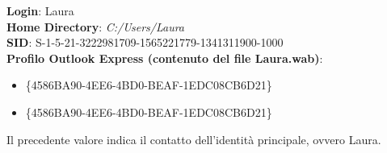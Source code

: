 \textbf{Login}: Laura\\
\textbf{Home Directory}: \textit{C:/Users/Laura}\\
\textbf{SID}: S-1-5-21-3222981709-1565221779-1341311900-1000\vspace{14pt}\\
\textbf{Profilo Outlook Express (contenuto del file Laura.wab)}:
\begin{itemize}
    \item \{4586BA90-4EE6-4BD0-BEAF-1EDC08CB6D21\}
    \item \{4586BA90-4EE6-4BD0-BEAF-1EDC08CB6D21\}
\end{itemize}
Il precedente valore indica il contatto dell'identità principale, ovvero Laura.